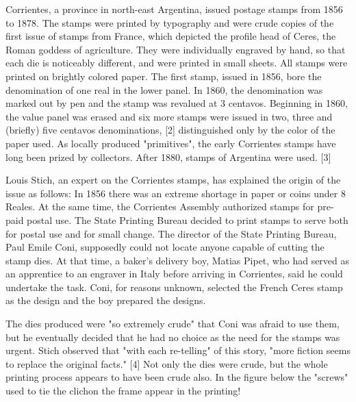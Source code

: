 Corrientes, a province in north-east Argentina, issued postage stamps from 1856 to 1878. The stamps were printed by typography and were crude copies of the first issue of stamps from France, which depicted the profile head of Ceres, the Roman goddess of agriculture. They were individually engraved by hand, so that each die is noticeably different, and were printed in small sheets. All stamps were printed on brightly colored paper. The first stamp, issued in 1856, bore the denomination of one real in the lower panel. In 1860, the denomination was marked out by pen and the stamp was revalued at 3 centavos. Beginning in 1860, the value panel was erased and six more stamps were issued in two, three and (briefly) five centavos denominations, [2] distinguished only by the color of the paper used. As locally produced "primitives", the early Corrientes stamps have long been prized by collectors. After 1880, stamps of Argentina were used. [3]





Louis Stich, an expert on the Corrientes stamps, has explained the origin of the issue as follows: In 1856 there was an extreme shortage in paper or coins under 8 Reales. At the same time, the Corrientes Assembly authorized stamps for pre-paid postal use. The State Printing Bureau decided to print stamps to serve both for postal use and for small change. The director of the State Printing Bureau, Paul Emile Coni, supposedly could not locate anyone capable of cutting the stamp dies. At that time, a baker's delivery boy, Matias Pipet, who had served as an apprentice to an engraver in Italy before arriving in Corrientes, said he could undertake the task. Coni, for reasons unknown, selected the French Ceres stamp as the design and the boy prepared the designs. 

The dies produced were "so extremely crude" that Coni was afraid to use them, but he eventually decided that he had no choice as the need for the stamps was urgent. Stich observed that "with each re-telling" of this story, "more fiction seems to replace the original facts." [4] Not only the dies were crude, but the whole printing process appears to have been crude also. In the figure below the "screws" used to tie the clich\es  on the frame appear in the printing!



